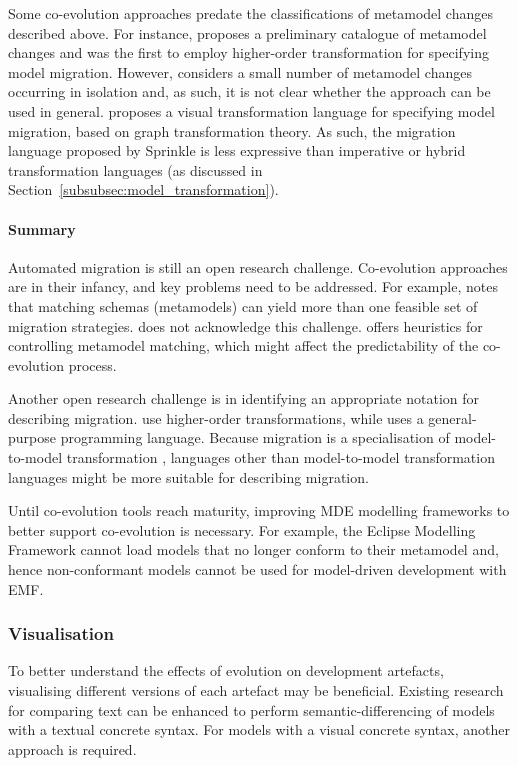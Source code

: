 Some co-evolution approaches predate the classifications of metamodel changes described above. For instance, \cite{wachsmuth07metamodel} proposes a preliminary catalogue of metamodel changes and was the first to employ higher-order transformation for specifying model migration. However, \cite{wachsmuth07metamodel} considers a small number of metamodel changes occurring in isolation and, as such, it is not clear whether the approach can be used in general. \cite{sprinkle03thesis} proposes a visual transformation language for specifying model migration, based on graph transformation theory. As such, the migration language proposed by Sprinkle is less expressive than imperative or hybrid transformation languages (as discussed in Section~\ref{subsubsec:model_transformation}).

\paragraph{Summary}
Automated migration is still an open research challenge. Co-evolution approaches are in their infancy, and key problems need to be addressed. For example, \cite{lerner00model} notes that matching schemas (metamodels) can yield more than one feasible set of migration strategies. \cite{cicchetti08automating} does not acknowledge this challenge. \cite{garces09managing} offers heuristics for controlling metamodel matching, which might affect the predictability of the co-evolution process.

Another open research challenge is in identifying an appropriate notation for describing migration.  \cite{wachsmuth07metamodel,cicchetti08automating} use higher-order transformations, while \cite{herrmannsdoerfer09cope} uses a general-purpose programming language. Because migration is a specialisation of model-to-model transformation \cite{sprinkle04domain}, languages other than model-to-model transformation languages might be more suitable for describing migration.

Until co-evolution tools reach maturity, improving MDE modelling frameworks to better support co-evolution is necessary. For example, the Eclipse Modelling Framework \cite{steinberg09emf} cannot load models that no longer conform to their metamodel and, hence non-conformant models cannot be used for model-driven development with EMF. 


\subsubsection{Visualisation}
To better understand the effects of evolution on development artefacts, visualising different versions of each artefact may be beneficial. Existing research for comparing text can be enhanced to perform semantic-differencing of models with a textual concrete syntax. For models with a visual concrete syntax, another approach is required. 

